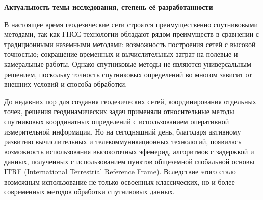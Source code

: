 
\begin{center}
	\textbf{Актуальность темы исследования, степень её разработанности}
\end{center}


В настоящее время геодезические сети строятся преимущественно спутниковыми методами, так как ГНСС технологии обладают рядом преимуществ в сравнении с традиционными наземными методами: возможность построения сетей с высокой точностью; сокращение временных и вычислительных затрат на полевые и камеральные работы. Однако спутниковые методы не являются универсальным решением, поскольку точность спутниковых определений во многом зависит от внешних условий и способа обработки.



До недавних пор для создания геодезических сетей, координирования отдельных точек, решения геодинамических задач применяли относительные методы спутниковых координатных определений с использованием оперативной измерительной информации. Но на сегодняшний день, благодаря активному развитию вычислительных и телекоммуникационных технологий, появилась возможность использования высокоточных эфемерид, алгоритмов с задержкой и данных, полученных с использованием пунктов общеземной глобальной основы ITRF (International Terrestrial Reference Frame). Вследствие этого стало возможным использование не только освоенных классических, но и более современных методов обработки спутниковых данных.

